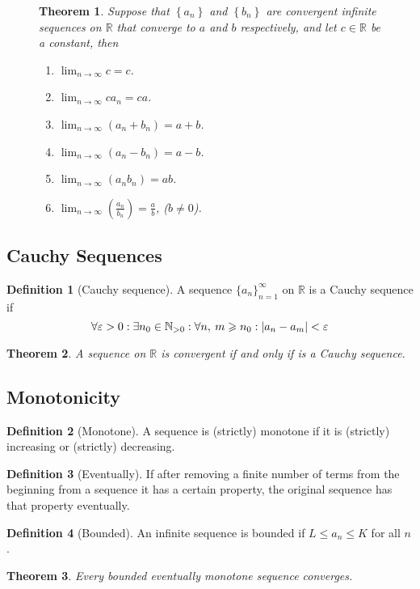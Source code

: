\documentclass{article}
\newcommand*{\N}{\mathbb{N}}
\newcommand*{\R}{\mathbb{R}}
\theoremstyle{plain}
\newtheorem{theorem}{Theorem}[section]
\numberwithin{theorem}{subsection}
\theoremstyle{definition}
\newtheorem{definition}{Definition}[section]
\numberwithin{definition}{subsection}
\theoremstyle{remark}
\numberwithin{note}{subsection}
\begin{document}
\begin{figure}[H]
    \begin{mdframed}[style=exampledefault,frametitle={Limit Laws for Sequences}]
        \begin{theorem}
            Suppose that $\left\{a_n\right\}$ and $\left\{b_n\right\}$ are convergent infinite sequences on $\R$ that converge to $a$ and $b$ respectively, and let $c\in\R$ be a constant, then
            \begin{enumerate}[label=\normalfont\alph*)]
                \item $\lim_{n\to\infty}c=c$.
                \item $\lim_{n\to\infty}ca_n=ca$.
                \item $\lim_{n\to\infty}\left( a_n + b_n \right)=a+b$.
                \item $\lim_{n\to\infty}\left( a_n - b_n \right)=a-b$.
                \item $\lim_{n\to\infty}\left( a_nb_n \right)=ab$.
                \item $\lim_{n\to\infty}\left( \frac{a_n}{b_n} \right)=\frac{a}{b}$, ($b\neq 0$).
            \end{enumerate}
        \end{theorem}
    \end{mdframed}
\end{figure}
%
\subsection{Cauchy Sequences}
\begin{definition}[Cauchy sequence]
    A sequence $\{a_n\}_{n=1}^\infty$ on $\R$ is a Cauchy sequence if
    \begin{equation*}
        \forall \varepsilon > 0:\exists n_0\in\N_{>0}:\forall n,\: m \geqslant n_0:\abs{a_n-a_m}<\varepsilon
    \end{equation*}
\end{definition}
\begin{theorem}
    A sequence on $\R$ is convergent if and only if is a Cauchy sequence.
\end{theorem}
\subsection{Monotonicity}
%
\begin{definition}[Monotone]
    A sequence is (strictly) monotone if it is
    (strictly) increasing or (strictly) decreasing.
\end{definition}
%
\begin{definition}[Eventually]
    If after removing a finite number of terms from the beginning from a sequence
    it has a certain property, the original sequence has that property eventually.
\end{definition}
%
\begin{definition}[Bounded]
    An infinite sequence is bounded if $L \leqslant a_n \leqslant K$ for all $n$.
\end{definition}
%
\begin{theorem}
    Every bounded eventually monotone sequence converges.
\end{theorem}
%
\end{document}
